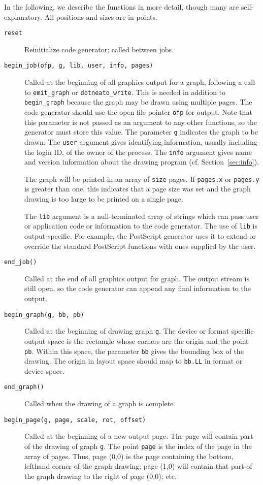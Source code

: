 In the following, we describe the functions in more detail, though
many are self-explanatory. 
All positions and sizes are in points.
\begin{description}
\item[{\tt reset}]
Reinitialize code generator; called between jobs.
\item[{\tt begin\_job(ofp, g, lib, user, info, pages)}]
Called at the beginning of all graphics output for a graph, following a call
to {\tt emit\_graph} or {\tt dotneato\_write}. 
This is needed in addition to {\tt begin\_graph}
because the graph may be drawn using multiple pages.
The code generator should use the open file
pointer {\tt ofp} for output. 
Note that this parameter is not passed as an
argument to any other functions, so the generator must store this value. 
The parameter {\tt g} indicates the graph to be drawn. 
The {\tt user} argument gives identifying information, 
usually including the login ID, of the owner of the process. 
The {\tt info} argument gives name and version information about the 
drawing program (cf. Section~\ref{sec:info}).

The graph will be printed in an array of {\tt size} pages. 
If {\tt pages.x} or {\tt pages.y} is greater than one, this indicates that a
page size was set and the graph drawing is too large to be printed on a
single page.

The {\tt lib} argument
is a null-terminated array of strings which can pass user or
application code or information to the code generator.
The use of {\tt lib} is output-specific. For example, the PostScript generator
uses it to extend or override the standard PostScript functions
with ones supplied by the user.
\item[{\tt end\_job()}]
Called at the end of all graphics output for graph. The output stream
is still open, so the code generator can append any final information
to the output.
\item[{\tt begin\_graph(g, bb, pb)}]
Called at the beginning of drawing graph {\tt g}.
The device or format specific output space is the rectangle whose corners
are the origin and the point {\tt pb}. Within this space,
the parameter {\tt bb} gives the bounding box of the drawing.
The origin in layout space should map to {\tt bb.LL} in format or device
space.
\item[{\tt end\_graph()}]
Called when the drawing of a graph is complete.
\item[{\tt begin\_page(g, page, scale, rot, offset)}] 
Called at the beginning of a new output page.
The page will contain part of the drawing of graph {\tt g}.
The point {\tt page} is the index of the page in the array of pages. 
Thus, page (0,0) is the page containing the bottom, lefthand corner
of the graph drawing; page (1,0) will contain that part of the graph
drawing to the right of page (0,0); etc. 


\end{description}
